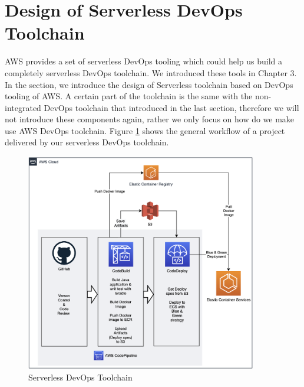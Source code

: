 \section{Design of Serverless DevOps Toolchain}
AWS provides a set of serverless DevOps tooling which could help us build a completely serverless DevOps toolchain. We introduced these tools in Chapter 3. In the section, we introduce the design of Serverless toolchain based on DevOps tooling of AWS. A certain part of the toolchain is the same with the non-integrated DevOps toolchain that introduced in the last section, therefore we will not introduce these components again, rather we only focus on how do we make use AWS DevOps toolchain. Figure \ref{fig:codepipeline} shows the general workflow of a project delivered by our serverless DevOps toolchain.
\begin{figure}[h]
 \centering
 \includegraphics[width=0.90\textwidth]{pics/codepipeline.png}
 \caption{Serverless DevOps Toolchain}
 \label{fig:codepipeline}
\end{figure}
